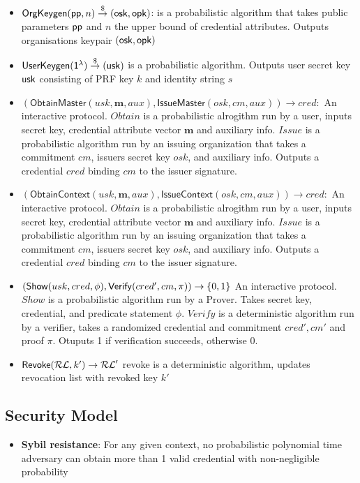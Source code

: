 {\begin{itemize}
    \item $\mathsf{OrgKeygen}(\mathsf{pp}, n) \stackrel{\$}{\to} (\mathsf{osk}, \mathsf{opk})$: is a probabilistic algorithm that takes public parameters $\mathsf{pp}$ and $n$ the upper bound of credential attributes. Outputs organisations keypair $(\mathsf{osk}, \mathsf{opk})$

    \item $\mathsf{UserKeygen}(\mathsf{1^{\lambda}}) \stackrel{\$}{\to} (\mathsf{usk})$ is a probabilistic algorithm. Outputs user secret key $\mathsf{usk}$ consisting of PRF key $k$ and identity string $s$

    \item $(\mathsf{Obtain Master}(usk, \textbf{m}, aux), \mathsf{Issue Master}(osk, cm, aux)) \to cred:$ An interactive protocol. $Obtain$ is a probabilistic alrogithm run by a user, inputs secret key, credential attribute vector $\textbf{m}$ and auxiliary info. $Issue$ is a probabilistic algorithm run by an issuing organization that takes a commitment $cm$, issuers secret key $osk$, and auxiliary info. Outputs a credential $cred$ binding $cm$ to the issuer signature.

    \item $(\mathsf{Obtain Context}(usk, \textbf{m}, aux), \mathsf{Issue Context}(osk, cm, aux)) \to cred:$ An interactive protocol. $Obtain$ is a probabilistic alrogithm run by a user, inputs secret key, credential attribute vector $\textbf{m}$ and auxiliary info. $Issue$ is a probabilistic algorithm run by an issuing organization that takes a commitment $cm$, issuers secret key $osk$, and auxiliary info. Outputs a credential $cred$ binding $cm$ to the issuer signature.

    \item $(\mathsf{Show}(usk, cred, \phi), \mathsf{Verify}(cred', cm, \pi)) \to \{0,1\}$ An interactive protocol. $Show$ is a probabilistic algorithm run by a Prover. Takes secret key, credential, and predicate statement $\phi$. $Verify$ is a deterministic algorithm run by a verifier, takes a randomized credential and commitment $cred', cm'$ and proof $\pi$. Otuputs 1 if verification succeeds, otherwise 0.

    \item $\mathsf{Revoke}(\mathcal{RL}, k') \to \mathcal{RL}'$ revoke is a deterministic algorithm, updates revocation list with revoked key $k'$
\end{itemize}

\subsection{Security Model}
\begin{itemize}
    \item \textbf{Sybil resistance}: For any given context, no probabilistic polynomial time adversary can obtain more than 1 valid credential with non-negligible probability 
    

\end{itemize}}
